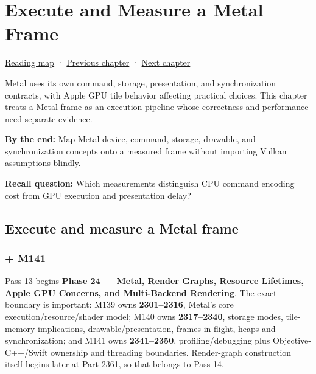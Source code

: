 \chapter{Execute and Measure a Metal Frame}\label{01-foundations-i-ch015-execute-and-measure-a-metal-frame}\hypertarget{01-foundations-i-ch015}{}\label{stagechapter:01-foundations-i-ch015}

\hypertarget{01-foundations-i-ch015-execute-and-measure-a-metal-frame}{}

\hyperref[volume-reading-map]{Reading map} · \hyperref[01-foundations-i-ch014-submit-synchronize-and-retire-gpu-work]{Previous chapter} · \hyperref[01-foundations-i-ch016-profile-gpus-and-respect-apple-ownership-boundaries]{Next chapter}

Metal uses its own command, storage, presentation, and synchronization contracts, with Apple GPU tile behavior affecting practical choices. This chapter treats a Metal frame as an execution pipeline whose correctness and performance need separate evidence.

\textbf{By the end:} Map Metal device, command, storage, drawable, and synchronization concepts onto a measured frame without importing Vulkan assumptions blindly.

\textbf{Recall question:} Which measurements distinguish CPU command encoding cost from GPU execution and presentation delay?

\section{Execute and measure a Metal frame}\label{01-foundations-i-ch015-execute-and-measure-a-metal-frame-1}

\hypertarget{01-foundations-i-ch015-execute-and-measure-a-metal-frame-1}{}

\subsection{+ M141}\label{01-foundations-i-ch015-m141}

\hypertarget{01-foundations-i-ch015-m141}{}

Pass 13 begins \textbf{Phase 24 --- Metal, Render Graphs, Resource Lifetimes, Apple GPU Concerns, and Multi-Backend Rendering}. The exact boundary is important: M139 owns \textbf{2301--2316}, Metal's core execution/resource/shader model; M140 owns \textbf{2317--2340}, storage modes, tile-memory implications, drawable/presentation, frames in flight, heaps and synchronization; and M141 owns \textbf{2341--2350}, profiling/debugging plus Objective-C++/Swift ownership and threading boundaries. Render-graph construction itself begins later at Part 2361, so that belongs to Pass 14.

